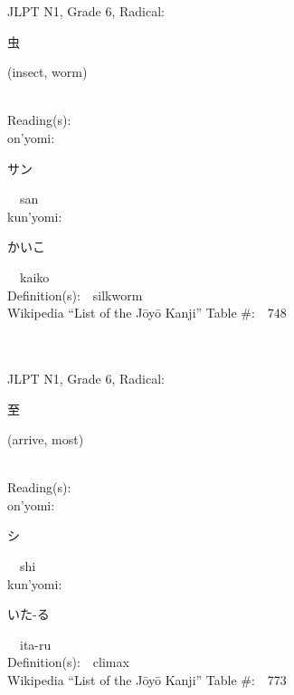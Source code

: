 \begin{multicols}{2}
{JLPT N1, Grade 6, Radical:\ \ {\begin{CJK}{UTF8}{min} 虫 \end{CJK}} (insect, worm) } \\
Reading(s):\ \ \\
{\hspace*{1em}}on'yomi:\ \ \\
{\hspace*{2em}}{\begin{CJK}{UTF8}{min} サン \end{CJK}}\ \ san\ \ \\
{\hspace*{1em}}kun'yomi:\ \ \\
{\hspace*{2em}}{\begin{CJK}{UTF8}{min} かいこ \end{CJK}}\ \ kaiko\ \ \\
Definition(s):\ \ silkworm \\
Wikipedia ``List of the J\=oy\=o Kanji'' Table \#:\ \ 748 \\
\ \ \\
{\fontsize{34pt}{40pt}  }\ \ \\  %
{JLPT N1, Grade 6, Radical:\ \ {\begin{CJK}{UTF8}{min} 至 \end{CJK}} (arrive, most) } \\
Reading(s):\ \ \\
{\hspace*{1em}}on'yomi:\ \ \\
{\hspace*{2em}}{\begin{CJK}{UTF8}{min} シ \end{CJK}}\ \ shi\ \ \\
{\hspace*{1em}}kun'yomi:\ \ \\
{\hspace*{2em}}{\begin{CJK}{UTF8}{min} いた-る \end{CJK}}\ \ ita-ru\ \ \\
Definition(s):\ \ climax \\
Wikipedia ``List of the J\=oy\=o Kanji'' Table \#:\ \ 773 \\
\ \ \\

\end{multicols}
